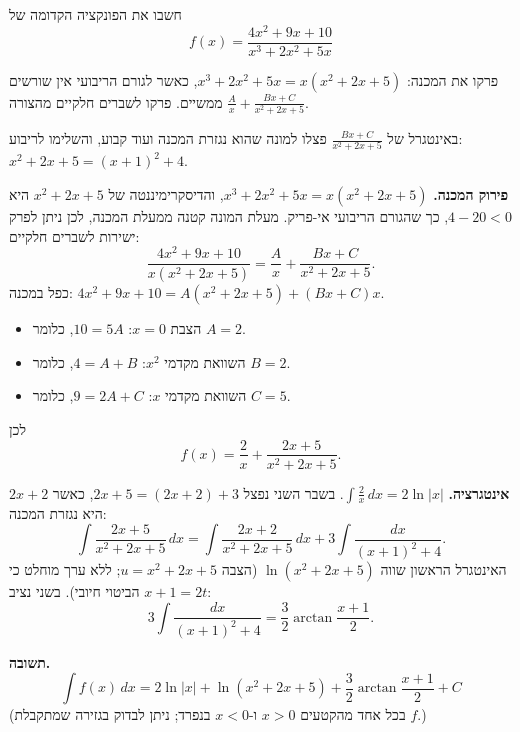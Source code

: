 
\begin{question}
חשבו את הפונקציה הקדומה של
\[ f(x)=\frac{4x^2+9x+10}{x^3+2x^2+5x} \]
\end{question}

\begin{hint}
פרקו את המכנה: $x^3+2x^2+5x=x(x^2+2x+5)$, כאשר לגורם הריבועי אין שורשים ממשיים. פרקו לשברים חלקיים מהצורה $\frac{A}{x}+\frac{Bx+C}{x^2+2x+5}$.
\end{hint}

\begin{hint}
באינטגרל של $\frac{Bx+C}{x^2+2x+5}$ פצלו למונה שהוא נגזרת המכנה ועוד קבוע, והשלימו לריבוע: $x^2+2x+5=(x+1)^2+4$.
\end{hint}

\begin{solution}
\textbf{פירוק המכנה.} $x^3+2x^2+5x=x(x^2+2x+5)$, והדיסקרימיננטה של $x^2+2x+5$ היא $4-20<0$, כך שהגורם הריבועי אי-פריק. מעלת המונה קטנה ממעלת המכנה, לכן ניתן לפרק ישירות לשברים חלקיים:
\[ \frac{4x^2+9x+10}{x(x^2+2x+5)}=\frac{A}{x}+\frac{Bx+C}{x^2+2x+5}. \]
כפל במכנה: $4x^2+9x+10=A(x^2+2x+5)+(Bx+C)x$.
\begin{itemize}
  \item הצבת $x=0$: $10=5A$, כלומר $A=2$.
  \item השוואת מקדמי $x^2$: $4=A+B$, כלומר $B=2$.
  \item השוואת מקדמי $x$: $9=2A+C$, כלומר $C=5$.
\end{itemize}
לכן
\[ f(x)=\frac{2}{x}+\frac{2x+5}{x^2+2x+5}. \]

\textbf{אינטגרציה.} $\int\frac{2}{x}\,dx=2\ln|x|$. בשבר השני נפצל $2x+5=(2x+2)+3$, כאשר $2x+2$ היא נגזרת המכנה:
\[ \int\frac{2x+5}{x^2+2x+5}\,dx=\int\frac{2x+2}{x^2+2x+5}\,dx+3\int\frac{dx}{(x+1)^2+4}. \]
האינטגרל הראשון שווה $\ln(x^2+2x+5)$ (הצבה $u=x^2+2x+5$; ללא ערך מוחלט כי הביטוי חיובי). בשני נציב $x+1=2t$:
\[ 3\int\frac{dx}{(x+1)^2+4}=\frac32\arctan\frac{x+1}{2}. \]

\textbf{תשובה.}
\[ \boxed{\int f(x)\,dx = 2\ln|x|+\ln(x^2+2x+5)+\frac32\arctan\frac{x+1}{2}+C} \]
(בכל אחד מהקטעים $x>0$ ו-$x<0$ בנפרד; ניתן לבדוק בגזירה שמתקבלת $f$.)
\end{solution}
